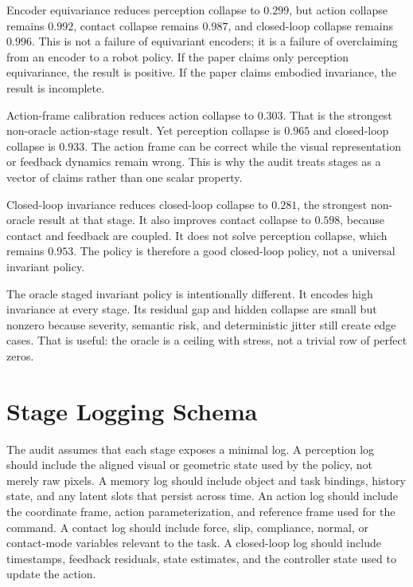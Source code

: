\documentclass{article}
\begin{document}
Encoder equivariance reduces perception collapse to $0.299$, but action collapse remains $0.992$, contact collapse remains $0.987$, and closed-loop collapse remains $0.996$. This is not a failure of equivariant encoders; it is a failure of overclaiming from an encoder to a robot policy. If the paper claims only perception equivariance, the result is positive. If the paper claims embodied invariance, the result is incomplete.

Action-frame calibration reduces action collapse to $0.303$. That is the strongest non-oracle action-stage result. Yet perception collapse is $0.965$ and closed-loop collapse is $0.933$. The action frame can be correct while the visual representation or feedback dynamics remain wrong. This is why the audit treats stages as a vector of claims rather than one scalar property.

Closed-loop invariance reduces closed-loop collapse to $0.281$, the strongest non-oracle result at that stage. It also improves contact collapse to $0.598$, because contact and feedback are coupled. It does not solve perception collapse, which remains $0.953$. The policy is therefore a good closed-loop policy, not a universal invariant policy.

The oracle staged invariant policy is intentionally different. It encodes high invariance at every stage. Its residual gap and hidden collapse are small but nonzero because severity, semantic risk, and deterministic jitter still create edge cases. That is useful: the oracle is a ceiling with stress, not a trivial row of perfect zeros.

\section{Stage Logging Schema}

The audit assumes that each stage exposes a minimal log. A perception log should include the aligned visual or geometric state used by the policy, not merely raw pixels. A memory log should include object and task bindings, history state, and any latent slots that persist across time. An action log should include the coordinate frame, action parameterization, and reference frame used for the command. A contact log should include force, slip, compliance, normal, or contact-mode variables relevant to the task. A closed-loop log should include timestamps, feedback residuals, state estimates, and the controller state used to update the action.
\end{document}
